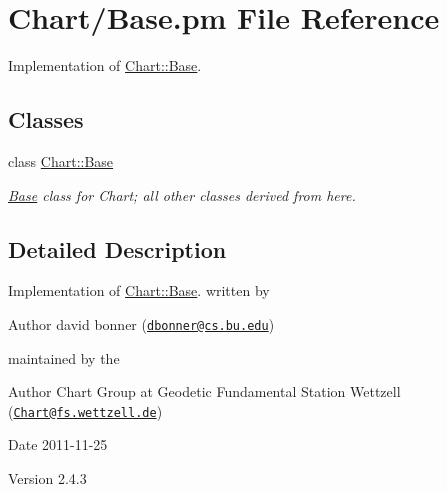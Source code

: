 \hypertarget{Base_8pm}{
\section{Chart/Base.pm File Reference}
\label{Base_8pm}
}


Implementation of \hyperlink{classChart_1_1Base}{Chart::Base}.  


\subsection*{Classes}
\begin{DoxyCompactItemize}
\item 
class \hyperlink{classChart_1_1Base}{Chart::Base}
\begin{DoxyCompactList}\small\item\em \hyperlink{classChart_1_1Base}{Base} class for Chart; all other classes derived from here. \item\end{DoxyCompactList}\end{DoxyCompactItemize}


\subsection{Detailed Description}
Implementation of \hyperlink{classChart_1_1Base}{Chart::Base}. written by \begin{DoxyAuthor}{Author}
david bonner (\href{mailto:dbonner@cs.bu.edu}{\tt dbonner@cs.bu.edu})
\end{DoxyAuthor}
maintained by the \begin{DoxyAuthor}{Author}
Chart Group at Geodetic Fundamental Station Wettzell (\href{mailto:Chart@fs.wettzell.de}{\tt Chart@fs.wettzell.de}) 
\end{DoxyAuthor}
\begin{DoxyDate}{Date}
2011-\/11-\/25 
\end{DoxyDate}
\begin{DoxyVersion}{Version}
2.4.3 
\end{DoxyVersion}
